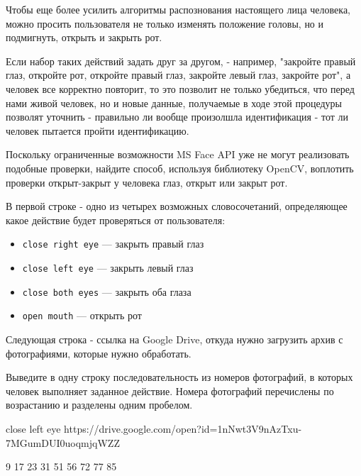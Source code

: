 
Чтобы еще более усилить алгоритмы распознования настоящего лица человека, можно просить пользователя не только изменять положение головы, но и подмигнуть, открыть и закрыть рот. 


Если набор таких действий задать друг за другом, - например, "закройте правый глаз, откройте рот, откройте правый глаз, закройте левый глаз, закройте рот", а человек все корректно повторит, то это позволит не только убедиться, что перед нами живой человек, но и новые данные, получаемые в ходе этой процедуры позволят уточнить - правильно ли вообще произолшла идентификация - тот ли человек пытается пройти идентификацию.


Поскольку ограниченные возможности MS Face API уже не могут реализовать подобные проверки, найдите способ, используя библиотеку OpenCV, воплотить проверки открыт-закрыт у человека глаз, открыт или закрыт рот.


В первой строке - одно из четырех возможных словосочетаний, определяющее какое действие будет проверяться от пользователя:
\begin{itemize}
  \item \texttt{close right eye} --- закрыть правый глаз  
  \item \texttt{close left eye} --- закрыть левый глаз
  \item \texttt{close both eyes} --- закрыть оба глаза
  \item \texttt{open mouth} --- открыть рот
\end{itemize}

Следующая строка - ссылка на Google Drive, откуда нужно загрузить архив с фотографиями, которые нужно обработать.

\outputfmtSection

Выведите в одну строку последовательность из номеров фотографий, в которых человек выполняет заданное действие. Номера фотографий перечислены по возрастанию и разделены одним пробелом.

\exampleSection


\begin{myverbbox}[\small]{\vinput}
close left eye
https://drive.google.com/open?id=1nNwt3V9nAzTxu-7MGumDUI0uoqmjqWZZ
\end{myverbbox}
\begin{myverbbox}[\small]{\voutput}
9 17 23 31 51 56 72 77 85
\end{myverbbox}

